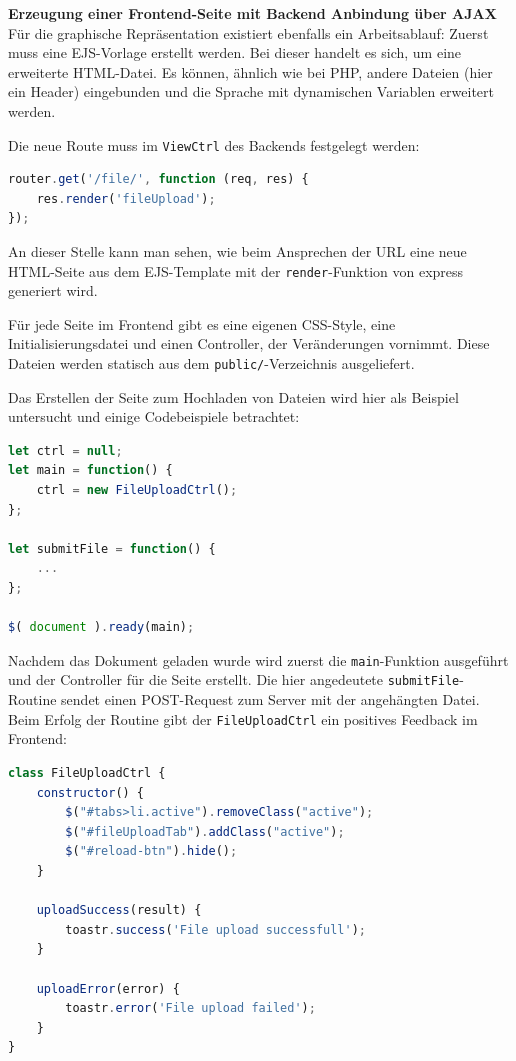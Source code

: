 \textbf{Erzeugung einer Frontend-Seite mit Backend Anbindung über AJAX}\\
Für die graphische Repräsentation existiert ebenfalls ein Arbeitsablauf: Zuerst muss eine EJS-Vorlage erstellt werden. Bei dieser handelt es sich, um eine erweiterte HTML-Datei. Es können, ähnlich wie bei PHP, andere Dateien (hier ein Header) eingebunden und die Sprache mit dynamischen Variablen erweitert werden.

Die neue Route muss im \lstinline|ViewCtrl| des Backends festgelegt werden:\\

\begin{lstlisting}[language=JavaScript, caption=Definition einer neuen Frontendroute in der viewCtrl.js]
router.get('/file/', function (req, res) {
	res.render('fileUpload');
});
\end{lstlisting}

An dieser Stelle kann man sehen, wie beim Ansprechen der URL eine neue HTML-Seite aus dem EJS-Template mit der \lstinline|render|-Funktion von express generiert wird.

Für jede Seite im Frontend gibt es eine eigenen CSS-Style, eine Initialisierungsdatei und einen Controller, der Veränderungen vornimmt. Diese Dateien werden statisch aus dem \lstinline|public/|-Verzeichnis ausgeliefert.

Das Erstellen der Seite zum Hochladen von Dateien wird hier als Beispiel untersucht und einige Codebeispiele betrachtet: \\

\begin{lstlisting}[language=JavaScript, caption=Initalisierungsfunktion der Uploadseite in der fileUpload.js]
let ctrl = null;
let main = function() {
	ctrl = new FileUploadCtrl();
};

let submitFile = function() {
	...
};

$( document ).ready(main);
\end{lstlisting}

Nachdem das Dokument geladen wurde wird zuerst die \lstinline|main|-Funktion ausgeführt und der Controller für die Seite erstellt. Die hier angedeutete \lstinline|submitFile|-Routine sendet einen POST-Request zum Server mit der angehängten Datei. Beim Erfolg der Routine gibt der \lstinline|FileUploadCtrl| ein positives Feedback im Frontend:\\

\begin{lstlisting}[language=JavaScript, caption=Initalisierungsfunktion der Uploadseite in der fileUpload.js]
class FileUploadCtrl {
	constructor() {
		$("#tabs>li.active").removeClass("active");
		$("#fileUploadTab").addClass("active");
		$("#reload-btn").hide();
	}

	uploadSuccess(result) {
		toastr.success('File upload successfull');
	}

	uploadError(error) {
		toastr.error('File upload failed');
	}
}        
\end{lstlisting}

